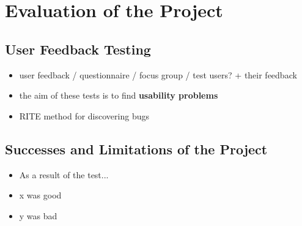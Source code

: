 \section{Evaluation of the Project}

\subsection{User Feedback Testing}
{\color{red}
	\begin{itemize}
		\item user feedback / questionnaire / focus group / test users? + their feedback
		\item the aim of these tests is to find \textbf{usability problems}
		\item RITE method for discovering bugs
	\end{itemize}
}

\subsection{Successes and Limitations of the Project}
{\color{red}
	\begin{itemize}
		\item As a result of the test...
		\item x was good
		\item y was bad
	\end{itemize}
}
